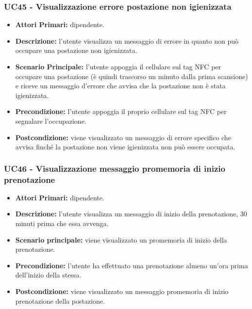\subsubsection{ UC45 - Visualizzazione errore postazione non igienizzata}
\begin{itemize}
	\item\textbf{Attori Primari:} dipendente.
	\item\textbf{Descrizione:} l’utente visualizza un messaggio di errore in quanto non può occupare una postazione non igienizzata.
	\item\textbf{Scenario Principale:} l'utente appoggia il cellulare sul tag NFC per occupare una postazione (è quindi trascorso un minuto dalla prima scansione) e riceve un messaggio d'errore che avvisa che la postazione non è stata igienizzata.
	\item\textbf{Precondizione:} l’utente appoggia il proprio cellulare sul tag NFC per segnalare l'occupazione. 
	\item\textbf{Postcondizione:} viene visualizzato un messaggio di errore specifico che avvisa finché la postazione non viene igienizzata non può essere occupata.
\end{itemize}

\subsubsection{ UC46 - Visualizzazione messaggio promemoria di inizio prenotazione}
\begin{itemize}
	\item\textbf{Attori Primari:} dipendente.
	\item\textbf{Descrizione:} l’utente visualizza un messaggio di inizio della prenotazione, 30 minuti prima che essa avvenga.
	\item\textbf{Scenario principale:} viene visualizzato un promemoria di inizio della prenotazione.
	\item\textbf{Precondizione:} l’utente ha effettuato una prenotazione almeno un'ora prima dell'inizio della stessa.
	\item\textbf{Postcondizione:} viene visualizzato un messaggio promemoria di inizio prenotazione della postazione.
\end{itemize}

